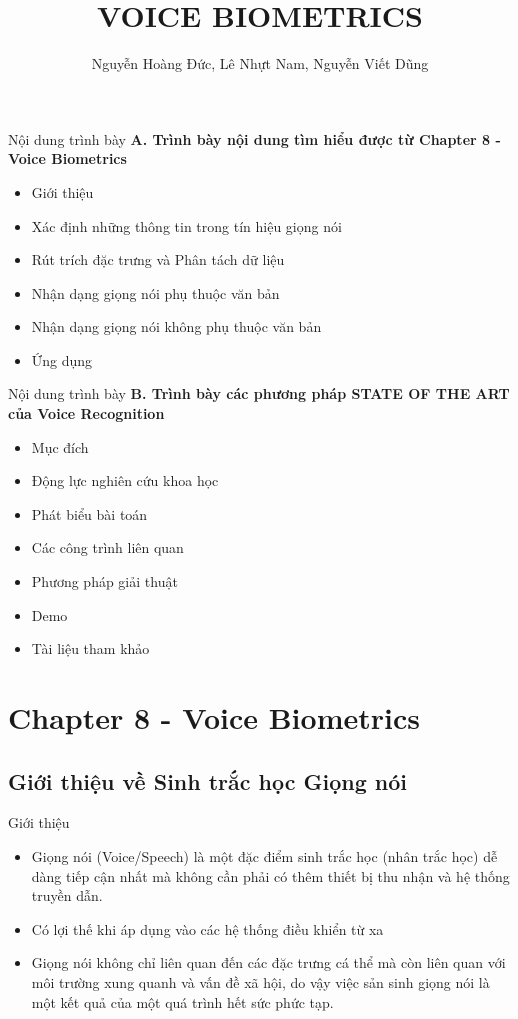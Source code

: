 \documentclass[notheorems, aspectratio=54]{beamer}
\author{Nguyễn Hoàng Đức, Lê Nhựt Nam, Nguyễn Viết Dũng}
\title{VOICE BIOMETRICS}
\institute{Đại học Khoa học Tự nhiên, Đại học Quốc Gia TP HCM}
\begin{document}
\begin{frame}
\titlepage
\end{frame}
\begin{frame}{Nội dung trình bày}
	\textbf{A. Trình bày nội dung tìm hiểu được từ Chapter 8 - Voice Biometrics}
	\begin{itemize}
		\item Giới thiệu
		\item Xác định những thông tin trong tín hiệu giọng nói
		\item Rút trích đặc trưng và Phân tách dữ liệu
		\item Nhận dạng giọng nói phụ thuộc văn bản
		\item Nhận dạng giọng nói không phụ thuộc văn bản
		\item Ứng dụng
	\end{itemize}
\end{frame}
\begin{frame}{Nội dung trình bày}
	\textbf{B. Trình bày các phương pháp STATE OF THE ART của Voice Recognition}
	\begin{itemize}
		\item Mục đích
		\item Động lực nghiên cứu khoa học 
		\item Phát biểu bài toán
		\item Các công trình liên quan
		\item Phương pháp giải thuật
		\item Demo
		\item Tài liệu tham khảo
	\end{itemize}
\end{frame}

\section{Chapter 8 - Voice Biometrics}
\subsection{Giới thiệu về Sinh trắc học Giọng nói}
\begin{frame}{Giới thiệu}
	\begin{itemize}
		\item Giọng nói (Voice/Speech) là một đặc điểm sinh trắc học (nhân trắc học) dễ dàng tiếp cận nhất mà không cần phải có thêm thiết bị thu nhận và hệ thống truyền dẫn.
		\item Có lợi thế khi áp dụng vào các hệ thống điều khiển từ xa
		\item Giọng nói không chỉ liên quan đến các đặc trưng cá thể mà còn liên quan với môi trường xung quanh và vấn đề xã hội, do vậy việc sản sinh giọng nói là một kết quả của một quá trình hết sức phức tạp.
	\end{itemize}
\end{frame}
\end{document}
